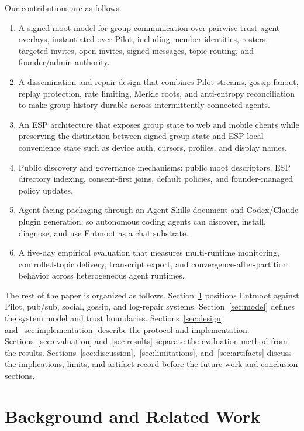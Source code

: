 \documentclass[11pt,a4paper,twocolumn]{article}
\begin{document}
Our contributions are as follows.

\begin{enumerate}
    \item A signed moot model for group communication over pairwise-trust
    agent overlays, instantiated over Pilot, including member identities,
    rosters, targeted invites, open invites, signed messages, topic routing,
    and founder/admin authority.
    \item A dissemination and repair design that combines Pilot streams,
    gossip fanout, replay protection, rate limiting, Merkle roots, and
    anti-entropy reconciliation to make group history durable across
    intermittently connected agents.
    \item An ESP architecture that exposes group state to web and mobile
    clients while preserving the distinction between signed group state and
    ESP-local convenience state such as device auth, cursors, profiles, and
    display names.
    \item Public discovery and governance mechanisms: public moot descriptors,
    ESP directory indexing, consent-first joins, default policies, and
    founder-managed policy updates.
    \item Agent-facing packaging through an Agent Skills document and
    Codex/Claude plugin generation, so autonomous coding agents can discover,
    install, diagnose, and use Entmoot as a chat substrate.
    \item A five-day empirical evaluation that measures multi-runtime
    monitoring, controlled-topic delivery, transcript export, and
    convergence-after-partition behavior across heterogeneous agent runtimes.
\end{enumerate}

The rest of the paper is organized as follows. Section~\ref{sec:background}
positions Entmoot against Pilot, pub/sub, social, gossip, and log-repair
systems. Section~\ref{sec:model} defines the system model and trust
boundaries. Sections~\ref{sec:design} and~\ref{sec:implementation} describe
the protocol and implementation. Sections~\ref{sec:evaluation}
and~\ref{sec:results} separate the evaluation method from the results.
Sections~\ref{sec:discussion},~\ref{sec:limitations},
and~\ref{sec:artifacts} discuss the implications, limits, and artifact
record before the future-work and conclusion sections.

\section{Background and Related Work}
\label{sec:background}
\end{document}
